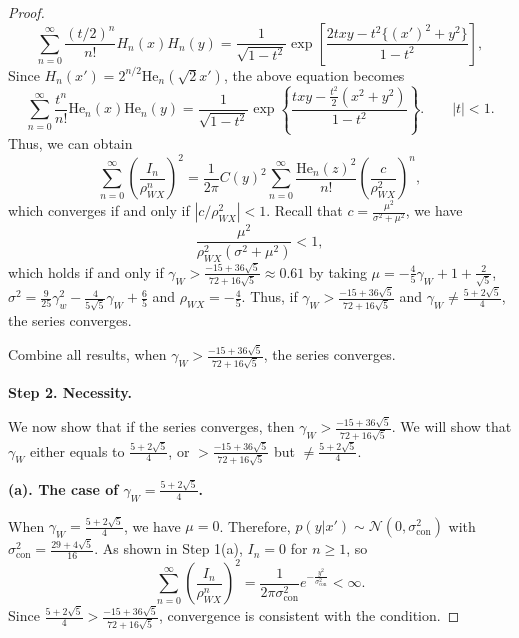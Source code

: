 \documentclass[
  12pt]{article}
\begin{document}
\begin{proof}
$$
\sum_{n=0}^{\infty} \frac{(t/2)^n}{n!} H_n(x) H_n(y) 
= \frac{1}{\sqrt{1 - t^2}} 
  \exp\left[\frac{2txy - t^2\{(x')^2 + y^2\}}{1 - t^2} \right],
$$
Since $H_n(x') = 2^{n/2} \mathrm{He}_n(\sqrt{2}x')$, the above equation becomes
$$
\sum_{n=0}^\infty \frac{t^n}{n!}\mathrm{He}_n(x)\mathrm{He}_n(y)
= \frac{1}{\sqrt{1-t^2}}
  \exp\left\{ \frac{txy - \tfrac{t^2}{2}(x^2+y^2)}{1-t^2}\right\}.
\qquad |t|<1.
$$
Thus, we can obtain
\begin{equation}\label{eq:series_convergence}
    \sum_{n=0}^\infty \left( \frac{I_n}{\rho_{WX}^n} \right)^2 = \frac{1}{2\pi} C(y)^2 \sum_{n=0}^{\infty} \frac{\mathrm{He}_n(z)^2}{n!}\left(\frac{c}{\rho_{WX}^2}\right)^n,
\end{equation}
which 
converges if and only if $| c / \rho_{WX}^2 | < 1$. Recall that $c=\frac{\mu^2}{\sigma^2 + \mu^2}$, we have
$$
\frac{\mu^2}{\rho_{WX}^{2}(\sigma^2+\mu^2)}<1, 
$$
which holds if and only if  $\gamma_W>\frac{-15+36\sqrt{5}}{72+16\sqrt{5}}\approx0.61$ by taking $\mu= -\frac{4}{5}\gamma_W+1+\frac{2}{\sqrt{5}}$, $\sigma^2=\frac{9}{25}\gamma_{w}^{2}-\frac{4}{5\sqrt{5}}\gamma_W+\frac{6}{5}$ and  $\rho_{WX} =-\frac{4}{5} $. Thus, if $\gamma_W>\frac{-15+36\sqrt{5}}{72+16\sqrt{5}}$ and $\gamma_W\ne \frac{5+2\sqrt{5}}{4}$, the series converges.

Combine all results, when $\gamma_W > \frac{-15 + 36\sqrt{5}}{72 + 16\sqrt{5}}$, the series converges.

\noindent\textbf{Step 2. Necessity.} 

We now show that if the series converges, then $\gamma_W>\frac{-15+36\sqrt{5}}{72+16\sqrt{5}}$. We will show that $\gamma_W$ either equals to $\frac{5 + 2\sqrt{5}}{4}$, or $>\frac{-15+36\sqrt{5}}{72+16\sqrt{5}}$ but $\neq \frac{5 + 2\sqrt{5}}{4}$. 

\noindent\textbf{(a). The case of $\gamma_W = \frac{5 + 2\sqrt{5}}{4}$.}

When $\gamma_W = \frac{5 + 2\sqrt{5}}{4}$, we have $\mu = 0$. Therefore, $p(y|x') \sim \mathcal{N}\left(0, \sigma_{\text{con}}^2\right)$ with $\sigma_{\text{con}}^2 = \frac{29 + 4\sqrt{5}}{16}$. As shown in Step 1(a), $I_n = 0$ for $n \geq 1$, so
$$
\sum_{n=0}^{\infty}{\left( \frac{I_n}{\rho_{WX}^{n}} \right)^2}
=\frac{1}{2\pi \sigma_{\mathrm{con}}^{2}}e^{-\frac{y^2}{\sigma_{\mathrm{con}}^{2}}}<\infty.
$$
Since $\frac{5 + 2\sqrt{5}}{4} > \frac{-15 + 36\sqrt{5}}{72 + 16\sqrt{5}}$, convergence is consistent with the condition.


\end{proof}
\end{document}
